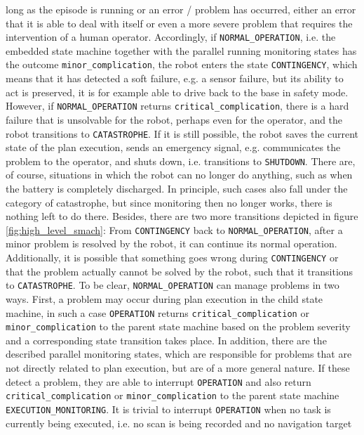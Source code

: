 \documentclass[english, master, utf8]{base/thesis_KBS}
\newcommand{\code}[1]{\colorbox{light-gray}{\texttt{#1}}}
\begin{document}
long as the episode is running or an error / problem has occurred, either an error that it is able to deal with itself or even a more severe problem that requires the 
intervention of a human operator. Accordingly, if \code{NORMAL\_OPERATION}, i.e. the embedded state machine together with the parallel running monitoring states has the outcome 
\code{minor\_complication}, the robot enters the state \code{CONTINGENCY}, which means that it has detected a soft failure, e.g. a sensor failure, but its ability to act
is preserved, it is for example able to drive back to the base in safety mode. However, if \code{NORMAL\_OPERATION} returns \code{critical\_complication}, there is a hard 
failure that is unsolvable for the robot, perhaps even for the operator, and the robot transitions to \code{CATASTROPHE}. If it is still possible, the robot saves the current 
state of the plan execution, sends an emergency signal, e.g. communicates the problem to the operator, and shuts down, i.e. transitions to \code{SHUTDOWN}.
There are, of course, situations in which the robot can no longer do anything, such as when the battery is completely discharged.
In principle, such cases also fall under the category of catastrophe, but since monitoring then no longer works, there is nothing left to do there.
Besides, there are two more transitions depicted in figure \ref{fig:high_level_smach}: From \code{CONTINGENCY} back to \code{NORMAL\_OPERATION}, after a minor problem is resolved by the robot, it can continue
its normal operation. Additionally, it is possible that something goes wrong during \code{CONTINGENCY} or that the problem actually cannot be solved by the robot,
such that it transitions to \code{CATASTROPHE}.\newline
To be clear, \code{NORMAL\_OPERATION} can manage problems in two ways.
First, a problem may occur during plan execution in the child state machine, in such a case \code{OPERATION} returns \code{critical\_complication} or 
\code{minor\_complication} to the parent state machine based on the problem severity and a corresponding state transition takes place.
In addition, there are the described parallel monitoring states, which are responsible for problems that are not directly related to plan execution, but are of a more general nature.
If these detect a problem, they are able to interrupt \code{OPERATION} and also return \code{critical\_complication} or \code{minor\_complication} to the parent state machine
\code{EXECUTION\_MONITORING}. It is trivial to interrupt \code{OPERATION} when no task is currently being executed, i.e. no scan is being recorded and no navigation target 
\end{document}
